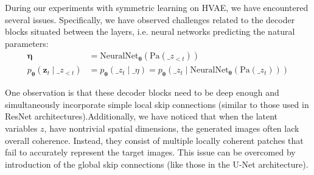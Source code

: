 
During our experiments with symmetric learning on HVAE, we have encountered several issues. Specifically, we have observed
challenges related to the decoder blocks situated between the layers, i.e. neural networks predicting the natural parameters:
\begin{align*}
    \boldsymbol{\eta} &= \mathrm{NeuralNet}_{\boldsymbol{\theta}}(\text{Pa}(\_z_{<t})) \\
    p_{\boldsymbol{\theta}}(\mathbf{z}_t \mid \_z_{<t}) &= p_{\boldsymbol{\theta}}(\_z_t \mid \_\eta) =  p_{\boldsymbol{\theta}}(\_z_t \mid \mathrm{NeuralNet}_{\boldsymbol{\theta}}(\text{Pa}(\_z_t)))
\end{align*}

One observation is that these decoder blocks need to be deep enough and simultaneously incorporate simple local skip connections 
(similar to those used in ResNet architectures).Additionally, we have noticed that when the latent variables  $z$, have
nontrivial spatial dimensions, the generated images often lack overall coherence. Instead, they consist of multiple locally 
coherent patches that fail to accurately represent the target images.
This issue can be overcomed by introduction of the global skip connections (like those in the U-Net architecture).
